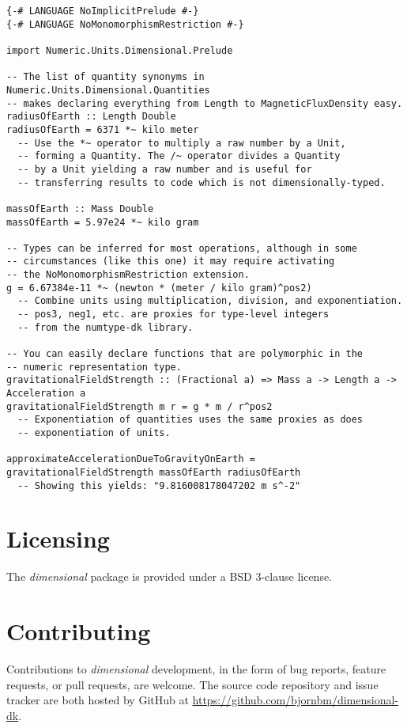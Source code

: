 \documentclass[11pt]{report}
\newcommand{\packagename}[1]{\textit{#1}}
\newcommand{\thispackage}{\packagename{dimensional}}
\begin{document}
\begin{lstlisting}
{-# LANGUAGE NoImplicitPrelude #-}
{-# LANGUAGE NoMonomorphismRestriction #-}

import Numeric.Units.Dimensional.Prelude

-- The list of quantity synonyms in Numeric.Units.Dimensional.Quantities
-- makes declaring everything from Length to MagneticFluxDensity easy.
radiusOfEarth :: Length Double
radiusOfEarth = 6371 *~ kilo meter
  -- Use the *~ operator to multiply a raw number by a Unit, 
  -- forming a Quantity. The /~ operator divides a Quantity
  -- by a Unit yielding a raw number and is useful for
  -- transferring results to code which is not dimensionally-typed.

massOfEarth :: Mass Double
massOfEarth = 5.97e24 *~ kilo gram

-- Types can be inferred for most operations, although in some
-- circumstances (like this one) it may require activating
-- the NoMonomorphismRestriction extension.
g = 6.67384e-11 *~ (newton * (meter / kilo gram)^pos2)
  -- Combine units using multiplication, division, and exponentiation.
  -- pos3, neg1, etc. are proxies for type-level integers
  -- from the numtype-dk library.

-- You can easily declare functions that are polymorphic in the
-- numeric representation type.
gravitationalFieldStrength :: (Fractional a) => Mass a -> Length a -> Acceleration a
gravitationalFieldStrength m r = g * m / r^pos2
  -- Exponentiation of quantities uses the same proxies as does
  -- exponentiation of units.

approximateAccelerationDueToGravityOnEarth = gravitationalFieldStrength massOfEarth radiusOfEarth
  -- Showing this yields: "9.816008178047202 m s^-2"
\end{lstlisting}

\section{Licensing}

The \thispackage{} package is provided under a BSD 3-clause license.

\section{Contributing}

Contributions to \thispackage{} development, in the form of bug reports,
feature requests, or pull requests, are welcome. The source code repository and issue
tracker are both hosted by GitHub at \url{https://github.com/bjornbm/dimensional-dk}.
\end{document}
